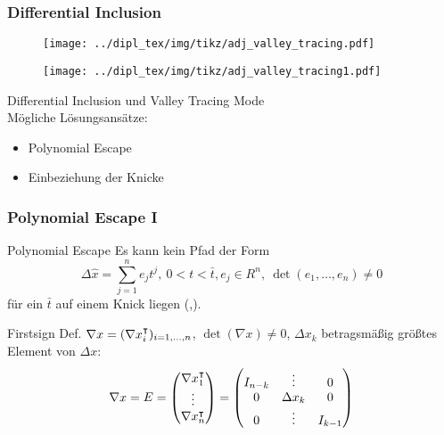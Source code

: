 \begin{frame}[<+->]
\frametitle{Differential Inclusion}
\centering
\begin{figure}
  \begin{minipage}{0.45\textwidth} 
	\texttt{[image: ../dipl\_tex/img/tikz/adj\_valley\_tracing.pdf]}
	\end{minipage}
	\hfill
	\begin{minipage}{0.45\textwidth}
	\texttt{[image: ../dipl\_tex/img/tikz/adj\_valley\_tracing1.pdf]}	
	\end{minipage}
	
\end{figure}
Differential Inclusion und Valley Tracing Mode \\
\pause
Mögliche Lösungsansätze:\hfill
\begin{itemize}
 \item Polynomial Escape
 \item Einbeziehung der Knicke
\end{itemize}
\end{frame}
\begin{frame}[<+->]
\frametitle{Polynomial Escape I}
\begin{block}{Polynomial Escape \cite[Prop. 6]{monster}}
 Es kann kein Pfad der Form
 \vspace*{-0.3cm}
 \[\Delta \hat x = \sum_{j=1}^n e_j t^j, ~ 0<t<\bar t, e_j\in R^n,~ \det(e_1,\ldots,e_n) \neq 0\]
 \vspace*{0.3cm}
 für ein $\bar t$ auf einem Knick liegen (\cite[Proposition 6]{monster},\cite[S.11]{plan}).
\end{block}
\begin{block}{Firstsign}
 Def. $\nabla x = (\nabla x_i^\intercal)_{i=1,\ldots,n}$, $\det(\nabla x)\neq 0$, $\Delta x_k$ betragsmäßig größtes Element von $\Delta x$: 
 \vspace*{-0.3cm}
 \[
 \nabla x = E =
\begin{pmatrix}
  \nabla x_1^\intercal\\
  \vdots\\
  \nabla x_n^\intercal\\
 \end{pmatrix}
 =
  \begin{pmatrix}
   I_{n-k} & \vdots &0\\
  0 & \Delta x_k & 0\\
    0 & \vdots&I_{k-1}
 \end{pmatrix}
\]

\end{block}

\end{frame}

